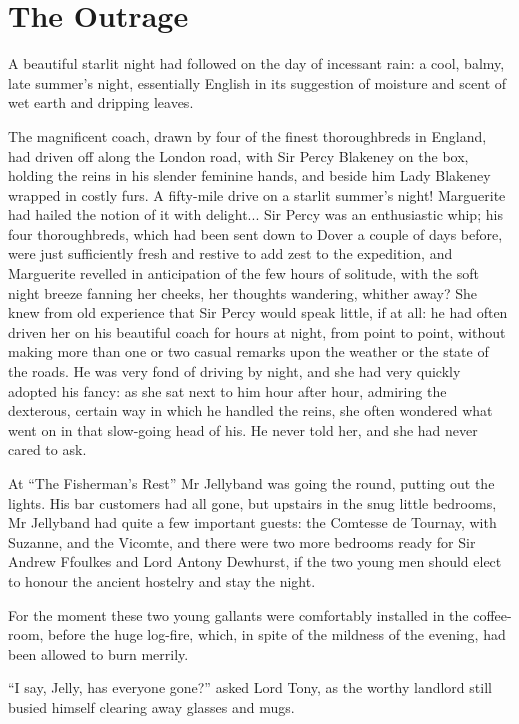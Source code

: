
\chapter{The Outrage}
\lettrine[lines=4]{A}{} beautiful starlit night had followed on the day of incessant rain: a cool, balmy, late summer's night, essentially English in its suggestion of moisture and scent of wet earth and dripping leaves.

The magnificent coach, drawn by four of the finest thoroughbreds in England, had driven off along the London road, with Sir Percy Blakeney on the box, holding the reins in his slender feminine hands, and beside him Lady Blakeney wrapped in costly furs. A fifty-mile drive on a starlit summer's night! Marguerite had hailed the notion of it with delight... Sir Percy was an enthusiastic whip; his four thoroughbreds, which had been sent down to Dover a couple of days before, were just sufficiently fresh and restive to add zest to the expedition, and Marguerite revelled in anticipation of the few hours of solitude, with the soft night breeze fanning her cheeks, her thoughts wandering, whither away? She knew from old experience that Sir Percy would speak little, if at all: he had often driven her on his beautiful coach for hours at night, from point to point, without making more than one or two casual remarks upon the weather or the state of the roads. He was very fond of driving by night, and she had very quickly adopted his fancy: as she sat next to him hour after hour, admiring the dexterous, certain way in which he handled the reins, she often wondered what went on in that slow-going head of his. He never told her, and she had never cared to ask.

At \enquote{The Fisherman's Rest} Mr Jellyband was going the round, putting out the lights. His bar customers had all gone, but upstairs in the snug little bedrooms, Mr Jellyband had quite a few important guests: the Comtesse de Tournay, with Suzanne, and the Vicomte, and there were two more bedrooms ready for Sir Andrew Ffoulkes and Lord Antony Dewhurst, if the two young men should elect to honour the ancient hostelry and stay the night.

For the moment these two young gallants were comfortably installed in the coffee-room, before the huge log-fire, which, in spite of the mildness of the evening, had been allowed to burn merrily.

\enquote{I say, Jelly, has everyone gone?} asked Lord Tony, as the worthy landlord still busied himself clearing away glasses and mugs.

